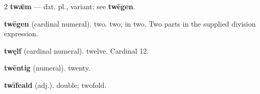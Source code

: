 \begin{multicols*}{2}
\textbf{twǣm} — dat. pl., variant: see \textbf{twēgen}.\par
\textbf{twēgen} (cardinal numeral). two. two; in two. Two parts in the supplied division expression.\par
\textbf{twęlf} (cardinal numeral). twelve. Cardinal 12.\par
\textbf{twēntig} (numeral). twenty.\par
\textbf{twīfeald} (adj.). double; twofold.\par

\end{multicols*}
